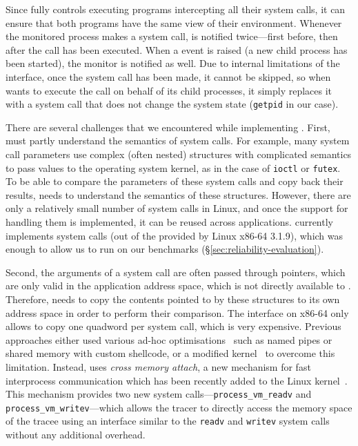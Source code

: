 Since \mxm fully controls executing programs intercepting all their system
calls, it can ensure that both programs have the same view of their
environment. Whenever the monitored process makes a system call, \mxm is
notified twice---first before, then after the call has been executed.  When a
\ptrace event is raised (\eg a new child process has been started), the monitor
is notified as well.  Due to internal limitations of the \ptrace interface,
once the system call has been made, it cannot be skipped, so when \mxm wants to
execute the call on behalf of its child processes, it simply replaces it with a
system call that does not change the system state (\lstinline`getpid` in our
case).

There are several challenges that we encountered while implementing
\mxm.  First, \mxm must partly understand the semantics of 
system calls.  For example, many system call parameters use complex
(often nested) structures with complicated semantics to pass values to
the operating system kernel, as in the case of \lstinline`ioctl` or
\lstinline`futex`.  To be able to compare the parameters of
these system calls and copy back their results, \mxm needs to
understand the semantics of these structures.  However, there are only
a relatively small number of system calls in Linux, and once the support
for handling them is implemented, it can be reused across applications.
\mxm currently implements \syscallsImplemented system calls (out of the
\syscallsTotal provided by Linux x86-64 3.1.9), which was enough to
allow us to run \mx on our benchmarks
(\S\ref{sec:reliability-evaluation}).

Second, the arguments of a system call are often passed through pointers,
which are only valid in the application address space, which is not directly
available to \mxm.  Therefore, \mxm needs to copy the contents pointed to by
these structures to its own address space in order to perform their
comparison.  The \ptrace interface on x86-64 only allows to copy one quadword
per system call, which is very expensive. Previous approaches either used
various ad-hoc optimisations~\cite{orchestra09} such as named pipes or shared
memory with custom shellcode, or a modified kernel~\cite{tachyon12} to
overcome this limitation. Instead, \mxm uses \emph{cross memory attach}, a new
mechanism for fast interprocess communication which has been recently added to
the Linux kernel~\cite{crossmemoryattach}.  This mechanism provides two new
system calls---\lstinline`process_vm_readv` and
\lstinline`process_vm_writev`---which allows the tracer to directly access the
memory space of the tracee using an interface similar to the \lstinline`readv`
and \lstinline`writev` system calls without any additional overhead.

